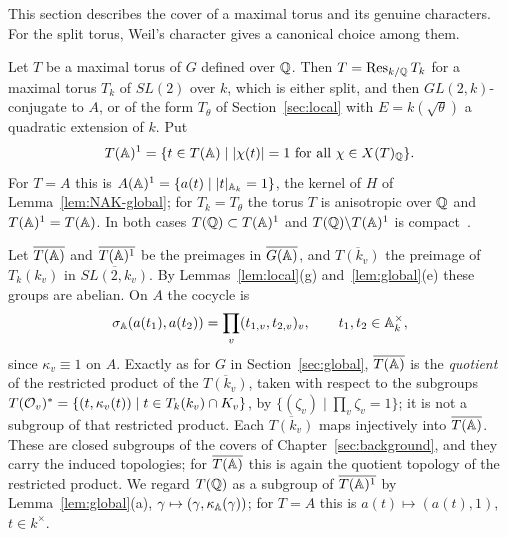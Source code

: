 This section describes the cover of a maximal torus and its genuine
characters. For the split torus, Weil's character gives a canonical
choice among them.


Let $T$ be a maximal torus of $G$ defined over $\mathbb{Q}$. Then
$T=\operatorname{Res}_{k/\mathbb{Q}}T_k$ for a maximal torus $T_k$ of $SL(2)$ over $k$, which
is either split, and then $GL(2,k)$-conjugate to $A$, or of the form
$T_\theta$ of Section~\ref{sec:local} with $E=k(\sqrt\theta)$ a quadratic
extension of $k$. Put
\[
T(\A)^1=\{t\in T(\A)\mid |\chi(t)|=1\ \text{for all}\ \chi\in X(T)_\Q\}.
\]
For $T=A$ this is $A(\mathbb{A})^1=\{a(t)\mid |t|_{\mathbb{A}_k}=1\}$, the kernel of
$H$ of Lemma~\ref{lem:NAK-global}; for $T_k=T_\theta$ the torus $T$ is
anisotropic over $\mathbb{Q}$ and $T(\mathbb{A})^1=T(\mathbb{A})$. In both cases
$T(\mathbb{Q})\subset T(\mathbb{A})^1$ and $T(\mathbb{Q})\backslash T(\mathbb{A})^1$ is
compact~\cite{PR94}.

Let $\overline{T(\mathbb{A})}$ and $\overline{T(\mathbb{A})^1}$ be the preimages in
$\overline{G(\mathbb{A})}$, and $\overline{T(k_v)}$ the preimage of $T_k(k_v)$
in $\overline{SL(2,k_v)}$. By Lemmas~\ref{lem:local}(g)
and~\ref{lem:global}(e) these groups are abelian. On $A$ the cocycle is
\begin{equation}\label{eq:cocycle-A}
\sigma_{\mathbb{A}}(a(t_1),a(t_2))=\prod_v(t_{1,v},t_{2,v})_v,\qquad
t_1,t_2\in\mathbb{A}_k^\times,
\end{equation}
since $\kappa_v\equiv1$ on $A$. Exactly as for $G$ in
Section~\ref{sec:global}, $\overline{T(\mathbb{A})}$ is the \emph{quotient} of the
restricted product of the $\overline{T(k_v)}$, taken with respect to the
subgroups $T(\mathcal{O}_v)^*=\{(t,\kappa_v(t))\mid t\in T_k(k_v)\cap K_v\}$, by
$\{(\zeta_v)\mid\prod_v\zeta_v=1\}$; it is not a subgroup of that
restricted product. Each $\overline{T(k_v)}$ maps injectively into
$\overline{T(\mathbb{A})}$. These are closed subgroups of the covers of
Chapter~\ref{sec:background}, and they carry the induced topologies; for
$\overline{T(\mathbb{A})}$ this is again the quotient topology of the restricted
product. We regard $T(\mathbb{Q})$ as a subgroup of $\overline{T(\mathbb{A})^1}$
by Lemma~\ref{lem:global}(a), $\gamma\mapsto(\gamma,\kappa_{\mathbb{A}}(\gamma))$;
for $T=A$ this is $a(t)\mapsto(a(t),1)$, $t\in k^\times$.

